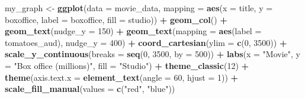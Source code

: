 \documentclass[
]{krantz}
\makeatletter
\newenvironment{Shaded}{\begin{snugshade}}{\end{snugshade}}
\newcommand{\DataTypeTok}[1]{\textcolor[rgb]{0.27,0.27,0.27}{#1}}
\newcommand{\DecValTok}[1]{\textcolor[rgb]{0.06,0.06,0.06}{#1}}
\newcommand{\KeywordTok}[1]{\textcolor[rgb]{0.27,0.27,0.27}{\textbf{#1}}}
\newcommand{\NormalTok}[1]{#1}
\newcommand{\OperatorTok}[1]{\textcolor[rgb]{0.43,0.43,0.43}{\textbf{#1}}}
\newcommand{\StringTok}[1]{\textcolor[rgb]{0.5,0.5,0.5}{#1}}
\newenvironment{kframe}{%
\medskip{}
\setlength{\fboxsep}{.8em}
 \def\at@end@of@kframe{}%
 \ifinner\ifhmode%
  \def\at@end@of@kframe{\end{minipage}}%
  \begin{minipage}{\columnwidth}%
 \fi\fi%
 \def\FrameCommand##1{\hskip\@totalleftmargin \hskip-\fboxsep
 \colorbox{shadecolor}{##1}\hskip-\fboxsep
     \hskip-\linewidth \hskip-\@totalleftmargin \hskip\columnwidth}%
 \MakeFramed {\advance\hsize-\width
   \@totalleftmargin\z@ \linewidth\hsize
   \@setminipage}}%
 {\par\unskip\endMakeFramed%
 \at@end@of@kframe}
\renewenvironment{Shaded}{\begin{kframe}}{\end{kframe}}
\makeatother
\begin{document}
\begin{Shaded}
\begin{Highlighting}[]
\NormalTok{my_graph <-}\StringTok{ }\KeywordTok{ggplot}\NormalTok{(}\DataTypeTok{data =}\NormalTok{ movie_data,}
           \DataTypeTok{mapping =} \KeywordTok{aes}\NormalTok{(}\DataTypeTok{x =}\NormalTok{ title,}
                         \DataTypeTok{y =}\NormalTok{ boxoffice,}
                         \DataTypeTok{label =}\NormalTok{ boxoffice, }
                         \DataTypeTok{fill =}\NormalTok{ studio)) }\OperatorTok{+}
\StringTok{  }\KeywordTok{geom_col}\NormalTok{() }\OperatorTok{+}
\StringTok{  }\KeywordTok{geom_text}\NormalTok{(}\DataTypeTok{nudge_y =} \DecValTok{150}\NormalTok{)  }\OperatorTok{+}
\StringTok{  }\KeywordTok{geom_text}\NormalTok{(}\DataTypeTok{mapping =} \KeywordTok{aes}\NormalTok{(}\DataTypeTok{label =}\NormalTok{ tomatoes_aud), }
            \DataTypeTok{nudge_y =} \DecValTok{400}\NormalTok{) }\OperatorTok{+}
\StringTok{  }\KeywordTok{coord_cartesian}\NormalTok{(}\DataTypeTok{ylim =} \KeywordTok{c}\NormalTok{(}\DecValTok{0}\NormalTok{, }\DecValTok{3500}\NormalTok{)) }\OperatorTok{+}
\StringTok{  }\KeywordTok{scale_y_continuous}\NormalTok{(}\DataTypeTok{breaks =} \KeywordTok{seq}\NormalTok{(}\DecValTok{0}\NormalTok{, }\DecValTok{3500}\NormalTok{, }\DataTypeTok{by =} \DecValTok{500}\NormalTok{)) }\OperatorTok{+}
\StringTok{  }\KeywordTok{labs}\NormalTok{(}\DataTypeTok{x =} \StringTok{"Movie"}\NormalTok{,}
       \DataTypeTok{y =} \StringTok{"Box office (millions)"}\NormalTok{,}
       \DataTypeTok{fill =} \StringTok{"Studio"}\NormalTok{) }\OperatorTok{+}
\StringTok{  }\KeywordTok{theme_classic}\NormalTok{(}\DecValTok{12}\NormalTok{) }\OperatorTok{+}
\StringTok{  }\KeywordTok{theme}\NormalTok{(}\DataTypeTok{axis.text.x =} \KeywordTok{element_text}\NormalTok{(}\DataTypeTok{angle =} \DecValTok{60}\NormalTok{, }
                                   \DataTypeTok{hjust =} \DecValTok{1}\NormalTok{)) }\OperatorTok{+}
\StringTok{  }\KeywordTok{scale_fill_manual}\NormalTok{(}\DataTypeTok{values =} \KeywordTok{c}\NormalTok{(}\StringTok{"red"}\NormalTok{, }\StringTok{"blue"}\NormalTok{))}
\end{Highlighting}
\end{Shaded}
\end{document}
